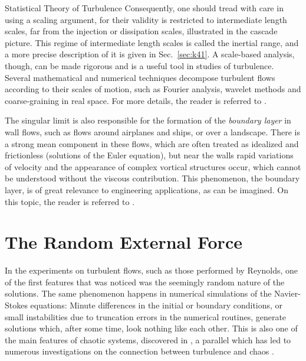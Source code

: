 \begin{chapter}{Statistical Theory of Turbulence}
Consequently, one should tread with care in using a scaling argument, for their validity is restricted to intermediate length scales, far from the injection or dissipation scales, illustrated in the cascade picture. This regime of intermediate length scales is called the inertial range, and a more precise description of it is given in Sec.~\ref{sec:k41}.
A scale-based analysis, though, can be made rigorous and is a useful tool in studies of turbulence. Several mathematical and numerical techniques decompose turbulent flows according to their scales of motion, such as Fourier analysis, wavelet methods and coarse-graining in real space. For more details, the reader is referred to \textcite{farge1992wavelet,pereira2012}.

The singular limit is also responsible for the formation of the \textit{boundary layer} in wall flows, such as flows around airplanes and ships, or over a landscape. There is a strong mean component in these flows, which are often treated as idealized and frictionless (solutions of the Euler equation), but near the walls rapid variations of velocity and the appearance of complex vortical structures occur, which cannot be understood without the viscous contribution. This phenomenon, the boundary layer, is of great relevance to engineering applications, as can be imagined. On this topic, the reader is referred to \textcite{schlichting2016}.

\section{The Random External Force} \label{sec:random}

In the experiments on turbulent flows, such as those performed by Reynolds,
one of the first features that was noticed was the seemingly random nature of the solutions. The same phenomenon happens in numerical simulations of the Navier-Stokes equations:
Minute differences in the initial or boundary conditions, or small instabilities due to truncation errors in the numerical routines, generate solutions which, after some time, look nothing like each other. This is also one of the main features of chaotic systems, discovered in \textcite{lorenz1963}, a parallel which has led to numerous investigations on the connection between turbulence and chaos \parencite{eyink2011,boffetta2017,berera2018}.


\end{chapter}
